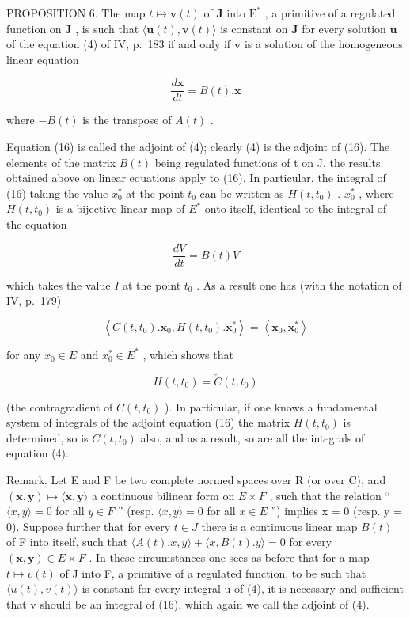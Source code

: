 PROPOSITION 6. The map \(t \mapsto \mathbf{v}(t)\) of \(\mathbf{J}\) into \(\mathrm{E}^*\) , a primitive of a regulated function on \(\mathbf{J}\) , is such that \(\langle \mathbf{u}(t), \mathbf{v}(t) \rangle\) is constant on \(\mathbf{J}\) for every solution \(\mathbf{u}\) of the equation (4) of IV, p.~183 if and only if \(\mathbf{v}\) is a solution of the homogeneous linear equation

\[
{\frac {d \mathbf {x}}{d t}} = B (t). \mathbf {x}\tag{16}
\]

where \(-B(t)\) is the transpose of \(A(t)\) .

Equation (16) is called the adjoint of (4); clearly (4) is the adjoint of (16). The elements of the matrix \(B(t)\) being regulated functions of t on J, the results obtained above on linear equations apply to (16). In particular, the integral of (16) taking the value \(x_{0}^{*}\) at the point \(t_{0}\) can be written as \(H(t, t_{0})\) . \(x_{0}^{*}\) , where \(H(t, t_{0})\) is a bijective linear map of \(E^{*}\) onto itself, identical to the integral of the equation

\[
\frac {d V}{d t} = B (t) V\tag{17}
\]

which takes the value \(I\) at the point \(t_0\) . As a result one has (with the notation of IV, p.~179)

\[
\left\langle C (t, t _ {0}). \mathbf {x} _ {0}, H (t, t _ {0}). \mathbf {x} _ {0} ^ {*} \right\rangle = \left\langle \mathbf {x} _ {0}, \mathbf {x} _ {0} ^ {*} \right\rangle
\]

for any \(x_{0} \in E\) and \(x_{0}^{*} \in E^{*}\) , which shows that

\[
H (t, t _ {0}) = \check {C} (t, t _ {0})\tag{18}
\]

(the contragradient of \(C(t, t_{0})\) ). In particular, if one knows a fundamental system of integrals of the adjoint equation (16) the matrix \(H(t, t_{0})\) is determined, so is \(C(t, t_{0})\) also, and as a result, so are all the integrals of equation (4).

Remark. Let E and F be two complete normed spaces over R (or over C), and \((\mathbf{x}, \mathbf{y}) \mapsto \langle \mathbf{x}, \mathbf{y} \rangle\) a continuous bilinear form on \(E \times F\) , such that the relation `` \(\langle x, y \rangle = 0\) for all \(y \in F\) '' (resp. \(\langle x, y \rangle = 0\) for all \(x \in E\) '') implies x = 0 (resp. y = 0). Suppose further that for every \(t \in J\) there is a continuous linear map \(B(t)\) of F into itself, such that \(\langle A(t).x, y \rangle + \langle x, B(t).y \rangle = 0\) for every \((\mathbf{x}, \mathbf{y}) \in E \times F\) . In these circumstances one sees as before that for a map \(t \mapsto v(t)\) of J into F, a primitive of a regulated function, to be such that \(\langle u(t), v(t) \rangle\) is constant for every integral u of (4), it is necessary and sufficient that v should be an integral of (16), which again we call the adjoint of (4).

